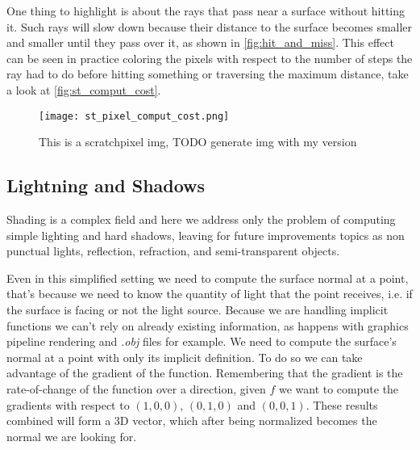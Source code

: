 One thing to highlight is about the rays that pass near a surface without hitting it.
Such rays will slow down because their distance to the surface becomes smaller and smaller until they pass over it, as shown in \autoref{fig:hit_and_miss}.
This effect can be seen in practice coloring the pixels with respect to the number of steps the ray had to do before hitting something or traversing the maximum distance, take a look at \autoref{fig:st_comput_cost}.
\begin{figure}[!htb]
  \centering
  \texttt{[image: st\_pixel\_comput\_cost.png]}
  \caption{This is a scratchpixel img, TODO generate img with my version}
  \label{fig:st_comput_cost}
\end{figure}






\subsection{Lightning and Shadows}



Shading is a complex field and here we address only the problem of computing simple lighting and hard shadows, leaving for future improvements topics as non punctual lights, reflection, refraction, and semi-transparent objects.

Even in this simplified setting we need to compute the surface normal at a point, 
that's because we need to know the quantity of light that the point receives, i.e. if the surface is facing or not the light source.
Because we are handling implicit functions we can't rely on already existing information, as happens with graphics pipeline rendering and \emph{.obj} files for example.
We need to compute the surface's normal at a point with only its implicit definition.
To do so we can take advantage of the gradient of the function.
Remembering that the gradient is the rate-of-change of the function over a direction, given $f$ we want to compute the gradients with respect to $(1,0,0)$, $(0,1,0)$ and $(0,0,1)$.
These results combined will form a 3D vector, which after being normalized becomes the normal we are looking for.

